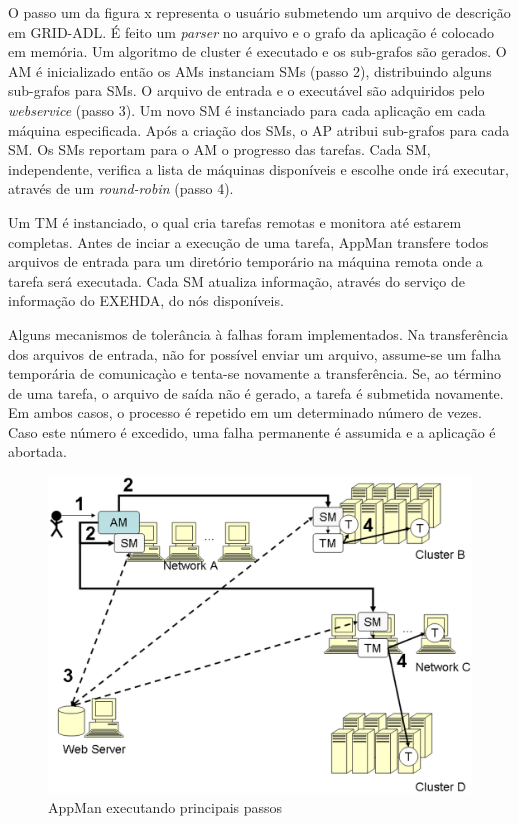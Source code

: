 O passo um da figura x representa o usuário submetendo um arquivo de descrição em GRID-ADL. É feito um \emph{parser} no arquivo e o grafo da aplicação é colocado em memória. Um algoritmo de cluster é executado e os sub-grafos são gerados. O AM é inicializado então os AMs instanciam SMs (passo 2), distribuindo alguns sub-grafos para SMs. O arquivo de entrada e o executável são adquiridos pelo \emph{webservice} (passo 3). Um novo SM é instanciado para cada aplicação em cada máquina especificada. Após a criação dos SMs, o AP atribui sub-grafos para cada SM. Os SMs reportam para o AM o progresso das tarefas. Cada SM, independente, verifica a lista de máquinas disponíveis e escolhe onde irá executar, através de um \emph{round-robin} (passo 4).

Um TM é instanciado, o qual cria tarefas remotas e monitora até estarem completas. Antes de inciar a execução de uma tarefa, AppMan transfere todos arquivos de entrada para um diretório temporário na máquina remota onde a tarefa será executada. Cada SM atualiza informação, através do serviço de informação do EXEHDA, do nós disponíveis. 

Alguns mecanismos de tolerância à falhas foram implementados. Na transferência dos arquivos de entrada, não for possível enviar um arquivo, assume-se um falha temporária de comunicaçào e tenta-se novamente a transferência. Se, ao término de uma tarefa, o arquivo de saída não é gerado, a tarefa é submetida novamente. Em ambos casos, o processo é repetido em um determinado número de vezes. Caso este número é excedido, uma falha permanente é assumida e a aplicação é abortada.

\begin{figure}[htb]
\begin{center}
\includegraphics[scale=0.15]{./img/AppMan.eps}
\caption{AppMan executando principais passos}
\label{fig:AppMan}
\end{center}
\end{figure}